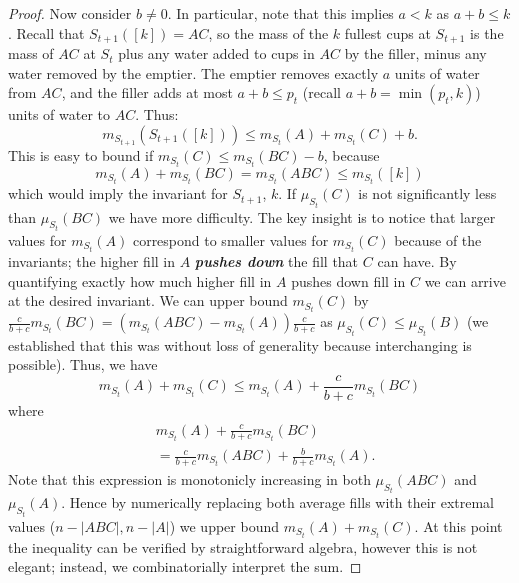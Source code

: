 \documentclass[twocolumn]{article}[10pt]
\newcommand{\defn}[1]{{\textit{\textbf{\boldmath #1}}}\xspace}
\begin{document}
\begin{proof}
Now consider $b\neq 0$. In particular, note that this implies $a < k$ as $a+b
\le k$. Recall that $S_{t+1}([k]) = AC$, so the mass of the $k$ fullest
cups at $S_{t+1}$ is the mass of $AC$ at $S_t$ plus any water added to
cups in $AC$ by the filler, minus any water removed by the emptier. 
The emptier removes exactly $a$ units of water from $AC$, and the filler
adds at most $a+b \le p_t$ (recall $a+b = \min(p_t, k)$) units of water to $AC$.
Thus:
$$m_{S_{t+1}}(S_{t+1}([k])) \le m_{S_t}(A) + m_{S_t}(C) + b.$$
This is easy to bound if $m_{S_t}(C) \le m_{S_t}(BC) - b$, because 
$$m_{S_t}(A) + m_{S_t}(BC)  = m_{S_t}(ABC) \le m_{S_t}([k])$$
which would imply the invariant for $S_{t+1}$, $k$.
If $\mu_{S_t}(C)$ is not significantly less than $\mu_{S_t}(BC)$ we have more difficulty.
The key insight is to notice that larger values for $m_{S_t}(A)$ correspond to
smaller values for $m_{S_t}(C)$ because of the invariants; the higher fill in
$A$ \defn{pushes down} the fill that $C$ can have.
By quantifying exactly how much higher fill in $A$ pushes down fill in $C$ we
can arrive at the desired invariant.
We can upper bound $m_{S_t}(C)$ by $\frac{c}{b+c}m_{S_t}(BC) = (m_{S_t}(ABC) - m_{S_t}(A))\frac{c}{b+c}$ as
$\mu_{S_t}(C) \le \mu_{S_t}(B)$ (we established that this was without loss of
generality because interchanging is possible).
Thus, we have 
$$m_{S_t}(A) + m_{S_t}(C) \le m_{S_t}(A) + \frac{c}{b+c}m_{S_t}(BC)$$
where 
\begin{equation}
  \label{eqn:redistributeA}
\begin{split}
  &m_{S_t}(A) + \frac{c}{b+c}m_{S_t}(BC) \\
  &= \frac{c}{b+c}m_{S_t}(ABC) + \frac{b}{b+c}m_{S_t}(A).
\end{split}
\end{equation}
Note that this expression is monotonicly increasing in both $\mu_{S_t}(ABC)$
and $\mu_{S_t}(A)$. Hence by numerically replacing both average fills with
their extremal values ($n-|ABC|, n-|A|$) we upper bound $m_{S_t}(A) + m_{S_t}(C)$.
At this point the inequality can be verified by straightforward algebra,
however this is not elegant; instead, we combinatorially interpret the sum.


\end{proof}
\end{document}
